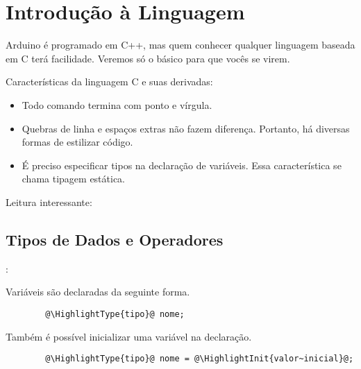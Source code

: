 
\section{Introdução à Linguagem}


\begin{frame}[b]{\insertsection}

	Arduino é programado em C++, mas quem conhecer qualquer linguagem baseada em C terá facilidade. Veremos só o básico para que vocês se virem.

	\bigskip
	Características da linguagem C e suas derivadas:
	\begin{itemize}
		\item Todo comando termina com ponto e vírgula.
		\item Quebras de linha e espaços extras não fazem diferença. Portanto, há diversas formas de estilizar código.
		\item É preciso especificar tipos na declaração de variáveis. Essa característica se chama tipagem estática.
	\end{itemize}

	\vfill
	Leitura interessante: 

\end{frame}


\subsection{Tipos de Dados e Operadores}


\begin{frame}[fragile]{\insertsection: \insertsubsection}

	Variáveis são declaradas da seguinte forma.
	\begin{verbatim}
		@\HighlightType{tipo}@ nome;
	\end{verbatim}

	Também é possível inicializar uma variável na declaração.
	\begin{verbatim}
		@\HighlightType{tipo}@ nome = @\HighlightInit{valor~inicial}@;
	\end{verbatim}

\end{frame}


